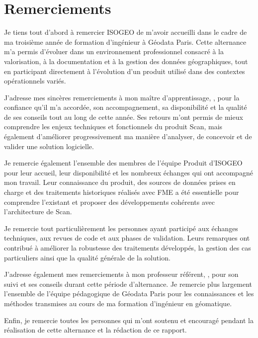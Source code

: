 \chapter*{Remerciements}

Je tiens tout d'abord à remercier ISOGEO de m'avoir accueilli dans le cadre de
ma troisième année de formation d'ingénieur à Géodata Paris. Cette alternance
m'a permis d'évoluer dans un environnement professionnel consacré à la
valorisation, à la documentation et à la gestion des données géographiques,
tout en participant directement à l'évolution d'un produit utilisé dans des
contextes opérationnels variés.

J'adresse mes sincères remerciements à mon maître d'apprentissage,
\ReportCompanyTutor, pour la confiance qu'il m'a accordée, son accompagnement,
sa disponibilité et la qualité de ses conseils tout au long de cette année.
Ses retours m'ont permis de mieux comprendre les enjeux techniques et
fonctionnels du produit Scan, mais également d'améliorer progressivement ma
manière d'analyser, de concevoir et de valider une solution logicielle.

Je remercie également l'ensemble des membres de l'équipe Produit d'ISOGEO pour
leur accueil, leur disponibilité et les nombreux échanges qui ont accompagné
mon travail.
Leur connaissance du produit, des sources de données prises en
charge et des traitements historiques réalisés avec FME a été essentielle pour
comprendre l'existant et proposer des développements cohérents avec
l'architecture de Scan.

Je remercie tout particulièrement les personnes ayant participé aux échanges
techniques, aux revues de code et aux phases de validation.
Leurs remarques ont
contribué à améliorer la robustesse des traitements développés, la gestion des
cas particuliers ainsi que la qualité générale de la solution.

J'adresse également mes remerciements à mon professeur référent,
\ReportAcademicTutor, pour son suivi et ses conseils durant cette période
d'alternance.
Je remercie plus largement l'ensemble de l'équipe pédagogique de
Géodata Paris pour les connaissances et les méthodes transmises au cours de ma
formation d'ingénieur en géomatique.

Enfin, je remercie toutes les personnes qui m'ont soutenu et encouragé pendant
la réalisation de cette alternance et la rédaction de ce rapport.
